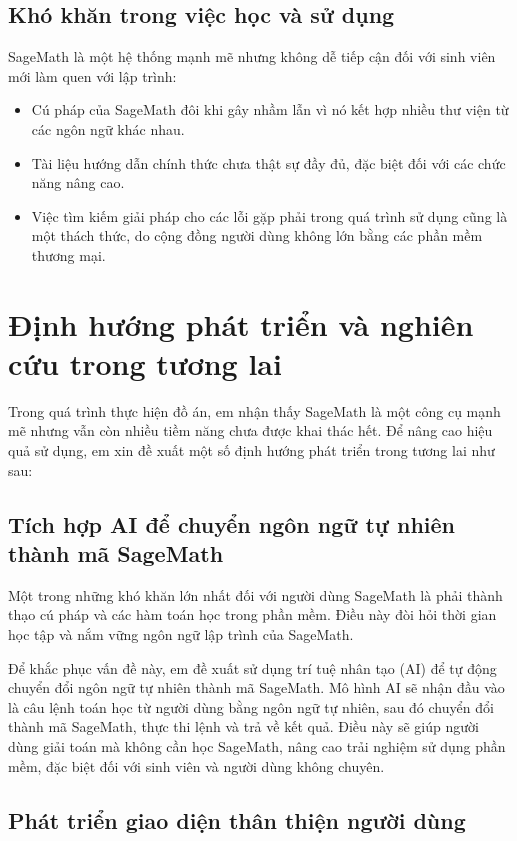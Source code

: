 \subsection{Khó khăn trong việc học và sử dụng}

SageMath là một hệ thống mạnh mẽ nhưng không dễ tiếp cận đối với sinh viên mới làm quen với lập trình:
\begin{itemize}
	\item Cú pháp của SageMath đôi khi gây nhầm lẫn vì nó kết hợp nhiều thư viện từ các ngôn ngữ khác nhau.
	\item Tài liệu hướng dẫn chính thức chưa thật sự đầy đủ, đặc biệt đối với các chức năng nâng cao.
	\item Việc tìm kiếm giải pháp cho các lỗi gặp phải trong quá trình sử dụng cũng là một thách thức, do cộng đồng người dùng không lớn bằng các phần mềm thương mại.
\end{itemize}

\section{Định hướng phát triển và nghiên cứu trong tương lai}

Trong quá trình thực hiện đồ án, em nhận thấy SageMath là một công cụ mạnh mẽ nhưng vẫn còn nhiều tiềm năng chưa được khai thác hết. Để nâng cao hiệu quả sử dụng, em xin đề xuất một số định hướng phát triển trong tương lai như sau:

\subsection{Tích hợp AI để chuyển ngôn ngữ tự nhiên thành mã SageMath}

Một trong những khó khăn lớn nhất đối với người dùng SageMath là phải thành thạo cú pháp và các hàm toán học trong phần mềm. Điều này đòi hỏi thời gian học tập và nắm vững ngôn ngữ lập trình của SageMath. 

Để khắc phục vấn đề này, em đề xuất sử dụng trí tuệ nhân tạo (AI) để tự động chuyển đổi ngôn ngữ tự nhiên thành mã SageMath. Mô hình AI sẽ nhận đầu vào là câu lệnh toán học từ người dùng bằng ngôn ngữ tự nhiên, sau đó chuyển đổi thành mã SageMath, thực thi lệnh và trả về kết quả. Điều này sẽ giúp người dùng giải toán mà không cần học SageMath, nâng cao trải nghiệm sử dụng phần mềm, đặc biệt đối với sinh viên và người dùng không chuyên.

\subsection{Phát triển giao diện thân thiện người dùng}

